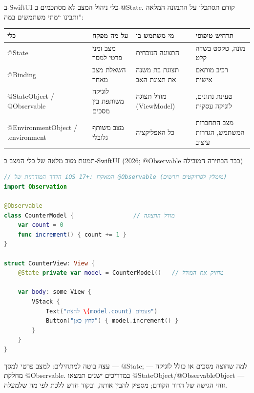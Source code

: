 


ב-SwiftUI כלי ניהול המצב לא מסתכמים ב-@State. קודם תסתכלו על התמונה המלאה ותבינו “מתי משתמשים במה”:

\begin{center}
\begin{tabularx}{\linewidth}{|X|X|X|X|}
\hline
\textbf{כלי} & \textbf{על מה מפקח} & \textbf{מי משתמש בו} & \textbf{תרחיש טיפוסי} \tabularnewline
\hline
@State & מצב זמני פרטי למסך & התצוגה הנוכחית & מונה, טקסט בשדה קלט \tabularnewline
@Binding & השאלת מצב מאחר & תצוגת בת משנה את תצוגת האב & רכיב מותאם אישית \tabularnewline
@StateObject / @Observable & לוגיקה משותפת בין מסכים & מודל תצוגה (ViewModel) & טעינת נתונים, לוגיקה עסקית \tabularnewline
@EnvironmentObject / .environment & מצב משותף גלובלי & כל האפליקציה & מצב התחברות המשתמש, הגדרות עיצוב \tabularnewline
\hline
\end{tabularx}
\end{center}

\begin{center}\small\color{gray}תמונת מצב מלאה של כלי המצב ב-SwiftUI (2026; @Observable כבר הבחירה המובילה)\end{center}

\begin{lstlisting}[language=Swift]
// הדרך המודרנית של iOS 17+: המאקרו @Observable (מומלץ לפרויקטים חדשים)
import Observation

@Observable
class CounterModel {                 // מודל התצוגה
    var count = 0
    func increment() { count += 1 }
}

struct CounterView: View {
    @State private var model = CounterModel()   // מחזיק את המודל

    var body: some View {
        VStack {
            Text("לחצת \(model.count) פעמים")
            Button("לחץ כאן") { model.increment() }
        }
    }
}
\end{lstlisting}

עצה בוטה למתחילים: למצב פרטי למסך — @State; למה שחוצה מסכים או כולל לוגיקה — מחלקת @Observable. במדריכים ישנים תמצאו @StateObject/@ObservableObject — זוהי הגישה של הדור הקודם; מספיק להבין אותה, ובקוד חדש ללכת לפי מה שלמעלה.

